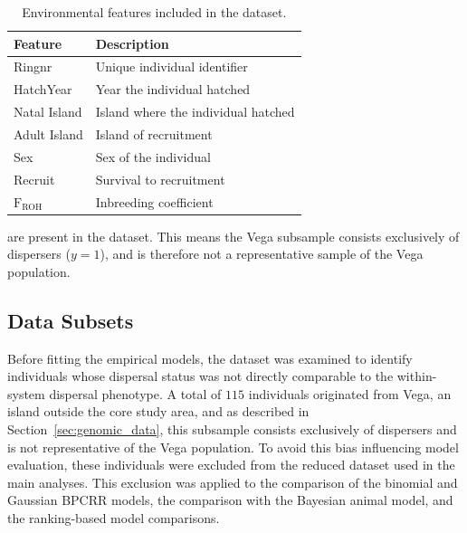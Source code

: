 \begin{table}[h!]
\centering
\caption{Environmental features included in the dataset.}
\vspace{6pt}
\label{tab:environmental covariates}
\begin{tabular}{ll}
\hline
\textbf{Feature} & \textbf{Description} \\
\hline
Ringnr        & Unique individual identifier \\
HatchYear     & Year the individual hatched \\
Natal Island  & Island where the individual hatched \\
Adult Island  & Island of recruitment  \\
Sex           & Sex of the individual  \\
Recruit       & Survival to recruitment \\
$\text{F}_\text{ROH}$  & Inbreeding coefficient \\
\hline
\end{tabular}
\end{table}

are present in the dataset. This means the Vega subsample consists exclusively of dispersers ($y = 1$), and is therefore not a representative sample of the Vega population. 


\subsection{Data Subsets}
\label{sec:data_subsets}

Before fitting the empirical models, the dataset was examined to identify individuals 
whose dispersal status was not directly comparable to the within-system dispersal 
phenotype. A total of $115$ individuals originated from Vega, an island outside the 
core study area, and as described in Section~\ref{sec:genomic_data}, this subsample 
consists exclusively of dispersers and is not representative of the Vega population. 
To avoid this bias influencing model evaluation, these individuals were excluded from 
the reduced dataset used in the main analyses. This exclusion was applied to the 
comparison of the binomial and Gaussian BPCRR models, the comparison with the 
Bayesian animal model, and the ranking-based model comparisons.

